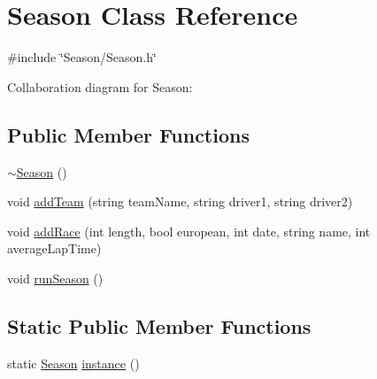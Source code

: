 \hypertarget{classSeason}{}\section{Season Class Reference}
\label{classSeason}


{\ttfamily \#include \char`\"{}Season/\+Season.\+h\char`\"{}}



Collaboration diagram for Season\+:
\subsection*{Public Member Functions}
\begin{DoxyCompactItemize}
\item 
\hyperlink{classSeason_a7dd3d83b670a108aa5a00f214757717e}{$\sim$\+Season} ()
\item 
void \hyperlink{classSeason_a46121f481fc764fa9e480708817442aa}{add\+Team} (string team\+Name, string driver1, string driver2)
\item 
void \hyperlink{classSeason_a6b4c865c1da9ad6ae00b1ce081aed292}{add\+Race} (int length, bool european, int date, string name, int average\+Lap\+Time)
\item 
void \hyperlink{classSeason_ac87bc08315fcfb5a5921e476ff608934}{run\+Season} ()
\end{DoxyCompactItemize}
\subsection*{Static Public Member Functions}
\begin{DoxyCompactItemize}
\item 
static \hyperlink{classSeason}{Season} \hyperlink{classSeason_a6f0fa8d25bd43abc987a25e6f6936fd7}{instance} ()
\end{DoxyCompactItemize}
